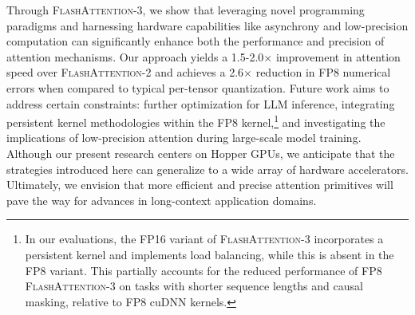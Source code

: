 Through \textsc{FlashAttention-3}, we show that leveraging novel programming paradigms and harnessing hardware capabilities like asynchrony and low-precision computation can significantly enhance both the performance and precision of attention mechanisms. Our approach yields a 1.5-2.0$\times$ improvement in attention speed over \textsc{FlashAttention-2} and achieves a 2.6$\times$ reduction in FP8 numerical errors when compared to typical per-tensor quantization. Future work aims to address certain constraints: further optimization for LLM inference, integrating persistent kernel methodologies within the FP8 kernel,\footnote{In our evaluations, the FP16 variant of \textsc{FlashAttention-3} incorporates a persistent kernel and implements load balancing, while this is absent in the FP8 variant. This partially accounts for the reduced performance of FP8 \textsc{FlashAttention-3} on tasks with shorter sequence lengths and causal masking, relative to FP8 cuDNN kernels.} and investigating the implications of low-precision attention during large-scale model training. Although our present research centers on Hopper GPUs, we anticipate that the strategies introduced here can generalize to a wide array of hardware accelerators. Ultimately, we envision that more efficient and precise attention primitives will pave the way for advances in long-context application domains.

